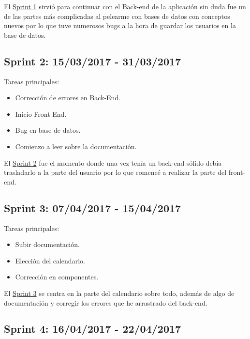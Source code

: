 El  \underline{Sprint 1} sirvió para continuar con el Back-end de la aplicación sin duda fue un de las partes más complicadas al pelearme con bases de datos con conceptos nuevos por lo que tuve numerosos bugs a la hora de guardar los usuarios en la base de datos.

\subsection{Sprint 2: 15/03/2017 - 31/03/2017}\label{sprint2}

Tareas principales:

\begin{itemize}
	\item Corrección de errores en Back-End.
	\item Inicio Front-End.
	\item Bug en base de datos.
	\item Comienzo a leer sobre la documentación.
\end{itemize}


El \underline{Sprint 2} fue el momento donde una vez tenía un back-end sólido debía trasladarlo a la parte del usuario por lo que comencé a realizar la parte del front-end.

\subsection{Sprint 3: 07/04/2017 - 15/04/2017}\label{sprint3}

Tareas principales:

\begin{itemize}
	\item Subir documentación.
	\item Elección del calendario.
	\item Corrección en componentes.
\end{itemize}


El \underline{Sprint 3} se centra en la parte del calendario sobre todo, además de algo de documentación y corregir los errores que he arrastrado del back-end.

\subsection{Sprint 4: 16/04/2017 - 22/04/2017}\label{sprint4}

